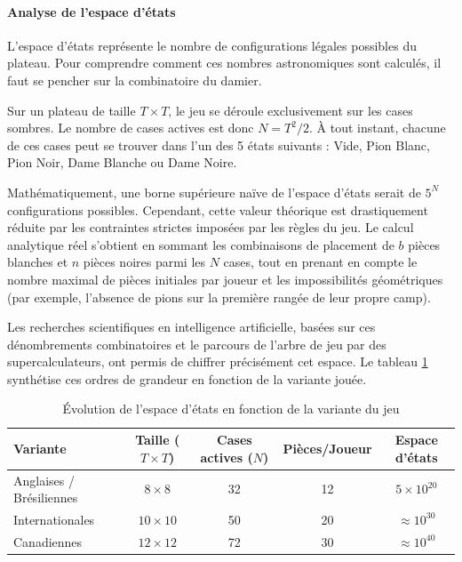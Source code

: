 \documentclass[a4paper]{article}
\begin{document}
\paragraph{Analyse de l'espace d'états}

L'espace d'états représente le nombre de configurations légales possibles du plateau. Pour comprendre 
comment ces nombres astronomiques sont calculés, il faut se pencher sur la combinatoire du damier.

Sur un plateau de taille $T \times T$, le jeu se déroule exclusivement sur les cases sombres. Le nombre de cases actives est donc $N = T^2 / 2$.
 À tout instant, chacune de ces cases peut se trouver dans l'un des 5 états suivants : Vide, Pion Blanc, Pion Noir, Dame Blanche ou Dame Noire. 

Mathématiquement, une borne supérieure naïve de l'espace d'états serait de $5^N$ configurations possibles. Cependant, cette valeur théorique 
est drastiquement réduite par les contraintes strictes imposées par les règles du jeu. Le calcul analytique réel s'obtient en sommant les 
combinaisons de placement de $b$ pièces blanches et $n$ pièces noires parmi les $N$ cases, tout en prenant en compte le nombre maximal de pièces 
initiales par joueur et les impossibilités géométriques (par exemple, l'absence de pions sur la première rangée de leur propre camp). 

Les recherches scientifiques en intelligence artificielle, basées sur ces dénombrements combinatoires et le parcours de l'arbre de jeu par des
 supercalculateurs, ont permis de chiffrer précisément cet espace. Le tableau \ref{tab:state-space} synthétise ces ordres de grandeur en fonction 
 de la variante jouée.

\begin{table}[!ht]
    \centering
    \caption{Évolution de l'espace d'états en fonction de la variante du jeu}
    \label{tab:state-space}
    \renewcommand{\arraystretch}{1.3}
    \begin{tabular}{|l|c|c|c|c|}
        \hline
        \textbf{Variante} & \textbf{Taille ($T \times T$)} & \textbf{Cases actives ($N$)} & \textbf{Pièces/Joueur} & \textbf{Espace d'états} \\ \hline
        Anglaises / Brésiliennes & $8 \times 8$ & 32 & 12 & $5 \times 10^{20}$ \\ \hline
        Internationales & $10 \times 10$ & 50 & 20 & $\approx 10^{30}$ \\ \hline
        Canadiennes & $12 \times 12$ & 72 & 30 & $\approx 10^{40}$ \\ \hline
    \end{tabular}
\end{table}
\end{document}
